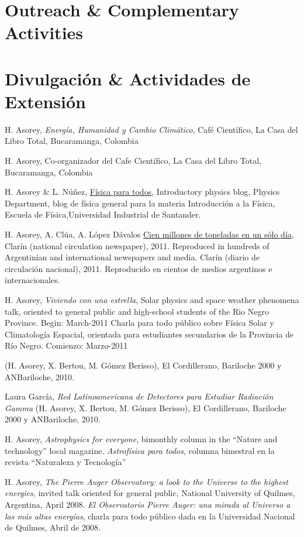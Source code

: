 \ifeng
\section*{Outreach \& Complementary Activities}
\else
\section*{Divulgación \& Actividades de Extensión}
\fi
\noindent

H. Asorey, {\it{Energía, Humanidad y Cambio Climático}}, Café Científico, La Casa del Libro Total, Bucaramanga, Colombia

H. Asorey, Co-organizador del Cafe Científico, La Casa del Libro Total, Bucaramanga, Colombia

 H. Asorey \& L. Núñez, \href{http://halley.uis.edu.co/fisica_para_todos}{Física para todos}, \ifeng Introductory physics blog, Physics Department, \else blog de física general para la materia Introducción a la Física, Escuela de Física,\fi  Universidad Industrial de Santander. 

H. Asorey, A. Clúa, A. López Dávalos \href{http://www.clarin.com/sociedad/Cien-millones-toneladas-cenizas-solo_0_517148395.html}{Cien millones de toneladas en un sólo día}, 
\ifeng
Clarín (national circulation newspaper), 2011. Reproduced in hundreds of Argentinian and international newspapers and media.
\else
Clarín (diario de circulación nacional), 2011. Reproducido en cientos de medios argentinos e internacionales.
\fi

H. Asorey, {\emph{Viviendo con una estrella}}, 
\ifeng 
Solar physics and space weather phenomena talk, oriented to general public and high-school students of the Rio Negro Province. Begin: March-2011
\else
Charla para todo público sobre Física Solar y Climatología Espacial, orientada para estudiantes secundarios de la Provincia de Río Negro. Comienzo: Marzo-2011
\fi

 (H. Asorey, X. Bertou, M. Gómez Berisso), El Cordillerano, Bariloche 2000 y ANBariloche, 2010.

Laura García, {\emph{Red Latinoamericana de Detectores para Estudiar Radiación Gamma}} (H. Asorey, X. Bertou, M. Gómez Berisso), El Cordillerano, Bariloche 2000 y ANBariloche, 2010.

H. Asorey, 
\ifeng
{\emph{Astrophysics for everyone}}, bimonthly column in the ``Nature and technology'' local magazine. \else
{\emph{Astrofísica para todos}}, columna bimestral en la revista ``Naturaleza y Tecnología''
\fi

H. Asorey, 
\ifeng
{\emph{The Pierre Auger Observatory: a look to the Universe to the highest energies}}, invited talk oriented for general public, National University of Quilmes, Argentina, April 2008.
\else
{\emph{El Observatorio Pierre Auger: una mirada al Universo a las más altas energías}}, charla para todo público dada en la Universidad Nacional de Quilmes, Abril de 2008.
\fi
